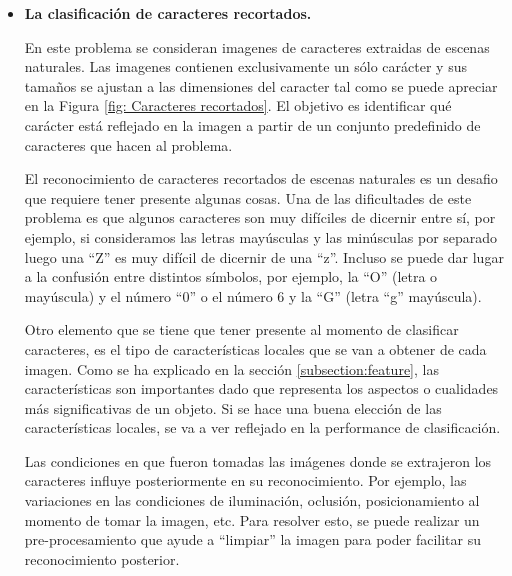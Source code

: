 	\begin{itemize}
		\item \textbf{La clasificación de caracteres recortados.}
		
		En este problema se consideran imagenes de caracteres extraidas de escenas naturales. Las imagenes contienen exclusivamente un sólo carácter y sus tamaños se ajustan a las dimensiones del caracter tal como se puede apreciar en la Figura \ref{fig: Caracteres recortados}. El objetivo es identificar qué carácter está reflejado en la imagen a partir de un conjunto predefinido de caracteres que hacen al problema.

		El reconocimiento de caracteres recortados de escenas naturales es un desafio que requiere tener presente algunas cosas. Una de las dificultades de este problema es que algunos caracteres son muy difíciles de dicernir entre sí, por ejemplo, si consideramos las letras mayúsculas y las minúsculas por separado luego una ``Z'' es muy difícil de dicernir de una ``z''. Incluso se puede dar lugar a la confusión entre distintos símbolos, por ejemplo, la ``O'' (letra o mayúscula) y el número ``0'' o el número 6 y la ``G'' (letra ``g'' mayúscula).
						
		Otro elemento que se tiene que tener presente al momento de clasificar caracteres, es el tipo de características locales que se van a obtener de cada imagen. Como se ha explicado en la sección \ref{subsection:feature}, las características son importantes dado que representa los aspectos o cualidades más significativas de un objeto. Si se hace una buena elección de las características locales, se va a ver reflejado en la performance de clasificación.
		
		Las condiciones en que fueron tomadas las imágenes donde se extrajeron los caracteres influye posteriormente en su reconocimiento. Por ejemplo, las variaciones en las condiciones de iluminación, oclusión, posicionamiento al momento de tomar la imagen, etc. Para resolver esto, se puede realizar un pre-procesamiento que ayude a ``limpiar'' la imagen para poder facilitar su reconocimiento posterior.
		

\end{itemize}
